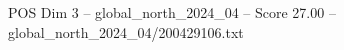 \begin{textsample}{POS Dim 3 – global\_north\_2024\_04 – Score 27.00 – global\_north\_2024\_04/200429106.txt}
\end{textsample}
